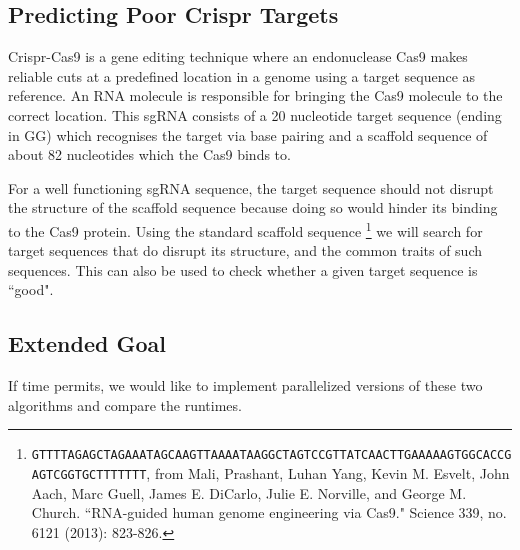 \documentclass[11pt,a4paper]{article}
\begin{document}
\subsection{Predicting Poor Crispr Targets}
Crispr-Cas9 is a gene editing technique where an endonuclease Cas9 makes reliable cuts at a predefined location in a genome using a target sequence as reference. An RNA molecule is responsible for bringing the Cas9 molecule to the correct location. This sgRNA consists of a 20 nucleotide target sequence (ending in GG) which recognises the target via base pairing and a scaffold sequence of about 82 nucleotides which the Cas9 binds to.

For a well functioning sgRNA sequence, the target sequence should not disrupt the structure of the scaffold sequence because doing so would hinder its binding to the Cas9 protein. Using the standard scaffold sequence \footnote{\tiny\texttt{GTTTTAGAGCTAGAAATAGCAAGTTAAAATAAGGCTAGTCCGTTATCAACTTGAAAAAGTGGCACCGAGTCGGTGCTTTTTTT}, from Mali, Prashant, Luhan Yang, Kevin M. Esvelt, John Aach, Marc Guell, James E. DiCarlo, Julie E. Norville, and George M. Church. ``RNA-guided human genome engineering via Cas9." Science 339, no. 6121 (2013): 823-826.} 
we will search for target sequences that do disrupt its structure, and the common traits of such sequences. This can also be used to check whether a given target sequence is ``good".%


\subsection{Extended Goal}
If time permits, we would like to implement parallelized versions of these two algorithms and compare the runtimes.


\iffalse %
\begin{thebibliography}{5}
\bibitem{4rus} Venkatachalam, Balaji, Dan Gusfield, and Yelena Frid. ``Faster algorithms for RNA-folding using the Four-Russians method." Algorithms for Molecular Biology 9, no. 1 (2014): 5.
\bibitem{Nussinov}  Nussinov, Ruth, George Pieczenik, Jerrold R. Griggs, and Daniel J. Kleitman. ``Algorithms for loop matchings." SIAM Journal on Applied mathematics 35, no. 1 (1978): 68-82.
\bibitem{scaffold} Mali, Prashant, Luhan Yang, Kevin M. Esvelt, John Aach, Marc Guell, James E. DiCarlo, Julie E. Norville, and George M. Church. ``RNA-guided human genome engineering via Cas9." Science 339, no. 6121 (2013): 823-826.
\end{thebibliography}
\fi %
\end{document}
